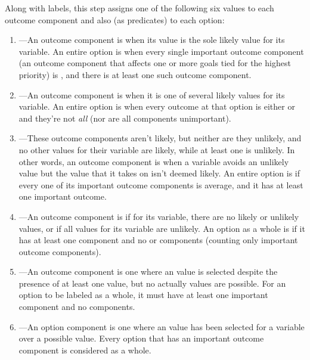 \begin{enumerate}[leftmargin=1.4em]
Along with  labels, this step assigns one of the following six  values to each outcome component and also (as  predicates) to each option:
%
\begin{enumerate}
\item
%
---An outcome component is  when its value is the sole likely value for its variable.
%
An entire option is  when every single important outcome component (an outcome component that affects one or more goals tied for the highest priority) is , and there is at least one such outcome component.
%
\item {}---An outcome component is  when it is one of several likely values for its variable.
%
An entire option is  when every outcome at that option is either   or  and they're not \emph{all}  (nor are all components unimportant).
%
\item {}---These outcome components aren't likely, but neither are they unlikely, and no other values for their variable are likely, while at least one is unlikely.
%
In other words, an outcome component is  when a variable avoids an unlikely value but the value that it takes on isn't deemed likely.
%
An entire option is  if every one of its important outcome components is average, and it has at least one important outcome.

\item {}---An outcome component is  if for its variable, there are no likely or unlikely values, or if all values for its variable are unlikely.
%
An option as a whole is  if it has at least one  component and no  or  components (counting only important outcome components).
\item {}---An  outcome component is one where an  value is selected despite the presence of at least one  value, but no actually  values are possible.
%
For an option to be labeled  as a whole, it must have at least one important  component and no  components.
\item {}---An  option component is one where an  value has been selected for a variable over a possible  value.
%
Every option that has an important  outcome component is considered  as a whole.
\end{enumerate}


\end{enumerate}
